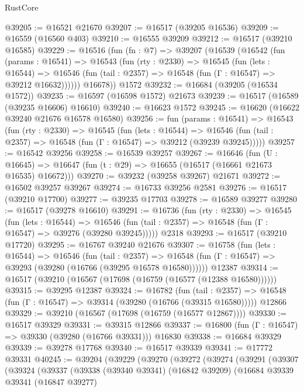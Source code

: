 \begin{lexlean}{RustCore}
\begin{coremodule}
@39205 := @16521 @21670
@39207 := @16517 (@39205 @16536)
@39209 := @16559 (@16560 @403)
@39210 := @16555 @39209
@39212 := @16517 (@39210 @16585)
@39229 := @16516
    (fun (fn : @7) =>
    @39207
      (@16539
        (@16542
          (fun (params : @16541) =>
          @16543
            (fun (rty : @2330) =>
            @16545
              (fun (lets : @16544) =>
              @16546 (fun (tail : @2357) => @16548 (fun (Γ : @16547) => @39212 @16632))))))
        @16678))
    @1572
@39232 := @16684 (@39205 (@16534 @1572))
@39235 := @16597 (@16598 @1572) @21673
@39239 := @16517 (@16589 (@39235 @16606) @16610)
@39240 := @16623 @1572
@39245 := @16620 (@16622 @39240 @21676 @16578 @16580)
@39256 := fun (params : @16541) =>
  @16543
    (fun (rty : @2330) =>
    @16545
      (fun (lets : @16544) =>
      @16546 (fun (tail : @2357) => @16548 (fun (Γ : @16547) => @39212 (@39239 @39245)))))
@39257 := @16542 @39256
@39258 := @16539 @39257
@39267 := @16646
    (fun (U : @16645) => @16647 (fun (t : @29) => @16655 (@16517 (@16661 @21673 @16535) @16672)))
@39270 := @39232 (@39258 @39267) @21671
@39272 := @16502 @39257 @39267
@39274 := @16733 @39256 @2581
@39276 := @16517 (@39210 @17700)
@39277 := @39235 @17703
@39278 := @16589 @39277
@39280 := @16517 (@39278 @16610)
@39291 := @16736
    (fun (rty : @2330) =>
    @16545
      (fun (lets : @16544) =>
      @16546 (fun (tail : @2357) => @16548 (fun (Γ : @16547) => @39276 (@39280 @39245)))))
    @2318
@39293 := @16517 (@39210 @17720)
@39295 := @16767 @39240 @21676
@39307 := @16758
    (fun (lets : @16544) =>
    @16546
      (fun (tail : @2357) =>
      @16548 (fun (Γ : @16547) => @39293 (@39280 (@16766 (@39295 @16578 @16580))))))
    @12387
@39314 := @16517 (@39210 (@16567 (@17698 (@16759 (@16577 (@12388 @16580))))))
@39315 := @39295 @12387
@39324 := @16782
    (fun (tail : @2357) => @16548 (fun (Γ : @16547) => @39314 (@39280 (@16766 (@39315 @16580)))))
    @12866
@39329 := @39210 (@16567 (@17698 (@16759 (@16577 @12867))))
@39330 := @16517 @39329
@39331 := @39315 @12866
@39337 := @16800 (fun (Γ : @16547) => @39330 (@39280 (@16766 @39331))) @16830
@39338 := @16684 @39329
@39339 := @39278 @17768
@39340 := @16517 @39339
@39341 := @17772 @39331
@40245 := @39204
    (@39229
      (@39270
        (@39272
          (@39274
            (@39291
              (@39307
                (@39324
                  (@39337
                    (@39338
                      (@39340 @39341)
                      (@16842 @39209)
                      (@16684
                        @39339
                        @39341
                        (@16847 @39277)

\end{coremodule}
\end{lexlean}
